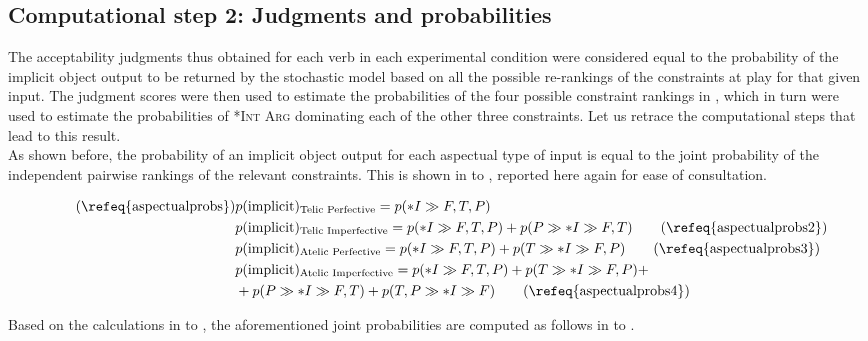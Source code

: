 \subsection{Computational step 2: Judgments and probabilities} The acceptability judgments thus obtained for each verb in each experimental condition were considered equal to the probability of the implicit object output to be returned by the stochastic model based on all the possible re-rankings of the constraints at play for that given input. The judgment scores were then used to estimate the probabilities of the four possible constraint rankings in , which in turn were used to estimate the probabilities of \textsc{*Int Arg} dominating each of the other three constraints. Let us retrace the computational steps that lead to this result.\\
As shown before, the probability of an implicit object output for each aspectual type of input is equal to the joint probability of the independent pairwise rankings of the relevant constraints. This is shown in  to , reported here again for ease of consultation.

\begin{align*}  \tag{\refeq{aspectualprobs}}
    & p(\text{implicit})\textsubscript{Telic Perfective} = p(*I \gg {F, T, P}) \\
    & p(\text{implicit})\textsubscript{Telic Imperfective} = p(*I \gg {F, T, P}) + p(P \gg *I \gg {F, T}) \tag{\refeq{aspectualprobs2}}\\
    & p(\text{implicit})\textsubscript{Atelic Perfective} = p(*I \gg {F, T, P}) + p(T \gg *I \gg {F, P}) \tag{\refeq{aspectualprobs3}}\\
    & p(\text{implicit})\textsubscript{Atelic Imperfective} = p(*I \gg {F, T, P}) + p(T \gg *I \gg {F, P}) + \nonumber \\ & + p(P \gg *I \gg {F, T}) + p({T, P} \gg *I \gg F) \tag{\refeq{aspectualprobs4}}
\end{align*}

Based on the calculations in  to , the aforementioned joint probabilities are computed as follows in  to .

